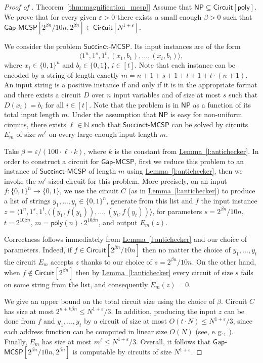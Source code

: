 \documentclass[11pt]{article}
\numberwithin{equation}{section}
\theoremstyle{definition}
\theoremstyle{plain}
\newcommand{\eg}{e.\,g.}
\newcommand{\expref}[2]{\hyperref[#2]{#1~\ref{#2}}}
\newcommand{\gapmcsp}{\mathsf{Gap}$-$\mathsf{MCSP}}
\begin{document}
\begin{proof}[Proof of \expref{Theorem}{thm:magnification_mcsp}]
Assume that $\mathsf{NP} \subseteq \mathsf{Circuit}[\mathsf{poly}]$. We prove that for every given $\varepsilon > 0$ there exists a small enough $\beta > 0$ such that $\gapmcsp[2^{\beta n}/10n, 2^{\beta n}] \in \mathsf{Circuit}[N^{1 + \varepsilon}]$.

We consider the problem $\mathsf{Succinct}$-$\mathsf{MCSP}$. Its input instances are of the form
%
\[
\langle 1^n, 1^{s}, 1^t, (x_1, b_1), \ldots, (x_{t}, b_{t}) \rangle,
\]
where $x_i \in \{0,1\}^n$ and $b_i \in \{0,1\}$, $i \in [t]$. Note that each instance can be encoded by a string of length exactly $m = n + 1 + s + 1 + t + 1 + t \cdot (n + 1)$. An input string is a positive instance if and only if it is in the appropriate format and there exists a circuit $D$ over $n$ input variables and of size at most $s$ such that $D(x_i) = b_i$ for all $i \in [t]$. Note that the problem is in $\mathsf{NP}$ as a function of its total input length $m$. Under the assumption that $\mathsf{NP}$ is easy for non-uniform circuits, there exists $\ell \in \mathbb{N}$ such that $\mathsf{Succinct}$-$\mathsf{MCSP}$ can be solved by circuits $E_m$ of size $m^\ell$ on every large enough input length $m$. 

Take $\beta = \varepsilon/(100 \cdot \ell \cdot k)$, where $k$ is the constant from \expref{Lemma}{l:antichecker}. In order to construct a circuit for $\gapmcsp$, first we reduce this problem to an instance of $\mathsf{Succinct}$-$\mathsf{MCSP}$ of length $m$ using \expref{Lemma}{l:antichecker}, then we invoke the $m^l$-sized circuit for this problem. More precisely, on an input $f \colon \{0,1\}^n \to \{0,1\}$, we use the circuit $C$ (as in \expref{Lemma}{l:antichecker}) to produce a list of strings $y_1, \ldots, y_t \in \{0,1\}^n$, generate from this list and $f$ the input instance $z = \langle 1^n, 1^s, 1^t, ((y_1, f(y_1)), \ldots, (y_t, f(y_t)) \rangle$, for parameters $s = 2^{\beta n}/10n$, $t = 2^{10 \beta n}$, $m = \mathsf{poly}(n) \cdot 2^{10 \beta n}$, and output $E_m(z)$.

Correctness follows immediately from \expref{Lemma}{l:antichecker} and our choice of parameters. Indeed, if $f \in \mathsf{Circuit}[2^{\beta n}/10n]$ then no matter the choice of $y_1, \ldots, y_t$ the circuit $E_m$ accepts $z$ thanks to our choice of $s = 2^{\beta n}/10n$. On the other hand, when $f \notin \mathsf{Circuit}[2^{\beta n}]$ then by \expref{Lemma}{l:antichecker} every circuit of size $s$ fails on some string from the list, and consequently $E_m(z) = 0$.

%
We give an upper bound on  %
the total circuit size using the choice of $\beta$. Circuit $C$ has size at most $2^{n + k \beta n} \leq N^{1 + \varepsilon}/3$. In addition, producing the input $z$ can be done from $f$ and $y_1, \ldots ,y_t$ by a circuit of size at most $O(t \cdot N) \leq N^{1 + \varepsilon}/3$, since each address function can be computed in linear size $O(N)$ (see, \eg,~\cite{DBLP:books/teu/Wegener87}). Finally, $E_m$ has size at most $m^\ell \leq N^{1 + \varepsilon}/3$. Overall, it follows that $\gapmcsp[2^{\beta n}/10n, 2^{\beta n}]$ is computable by circuits of size $N^{1 + \varepsilon}$. 
\end{proof}
\end{document}
